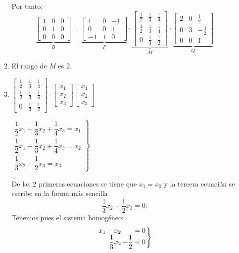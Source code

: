 \begin{enumerate}[label=\color{red}\textbf{\arabic*)}, leftmargin=*]
\begin{enumerate}[label=\color{red}\alph*)]
Por tanto:\[\underbrace{\left[\begin{array}{cc|c}
1 & 0 & 0\\
0 & 1 & 0\\ \hline
0 & 0 & 0
\end{array}\right] }_{B}=\underbrace{\begin{bmatrix}
1 & 0 & -1 \\ 
0 & 0 & 1 \\ 
-1 & 1 & 0
\end{bmatrix} }_{P}\cdot\underbrace{\begin{bmatrix}
\frac{1}{2} & \frac{1}{3} & \frac{1}{4} \\ 
\frac{1}{2} & \frac{1}{3} & \frac{1}{4} \\ 
0 & \frac{1}{3} & \frac{1}{2}
\end{bmatrix} }_{M}\cdot\underbrace{\begin{bmatrix}
2 & 0 & \frac{1}{2} \\ 
0 & 3 & -\frac{3}{2} \\ 
0 & 0 & 1
\end{bmatrix} }_{Q} \]
		\item {}

		El rango de $M$ es 2.
		\item {}
		
		$\begin{bmatrix}
\frac{1}{2} & \frac{1}{3} & \frac{1}{4} \\ 
\frac{1}{2} & \frac{1}{3} & \frac{1}{4} \\ 
0 & \frac{1}{3} & \frac{1}{2}
\end{bmatrix}\cdot\begin{bmatrix}
x_1\\
x_2\\
x_3
\end{bmatrix}\begin{bmatrix}
x_1\\
x_2\\
x_3
\end{bmatrix} $

$\left.\begin{array}{r}
\dfrac{1}{2}x_1+\dfrac{1}{3}x_2+\dfrac{1}{4}x_3=x_1\\
\dfrac{1}{2}x_1+\dfrac{1}{3}x_2+\dfrac{1}{4}x_3=x_2\\
\dfrac{1}{3}x_2+\dfrac{1}{2}x_3=x_3
\end{array}\right\}$

De las 2 primeras ecuaciones se tiene que $x_1=x_2$ y la tercera ecuación se escribe en la forma más sencilla \[ \dfrac{1}{3}x_2-\dfrac{1}{2}x_3=0. \]Tenemos pues el sistema homogéneo: \[\setlength{\arraycolsep}{1pt} \left.\begin{array}{rr}
x_1-x_2&=0\\
\dfrac{1}{3}x_2&-\dfrac{1}{2}=0
\end{array}\right\} \]
	\end{enumerate}
\end{enumerate}
